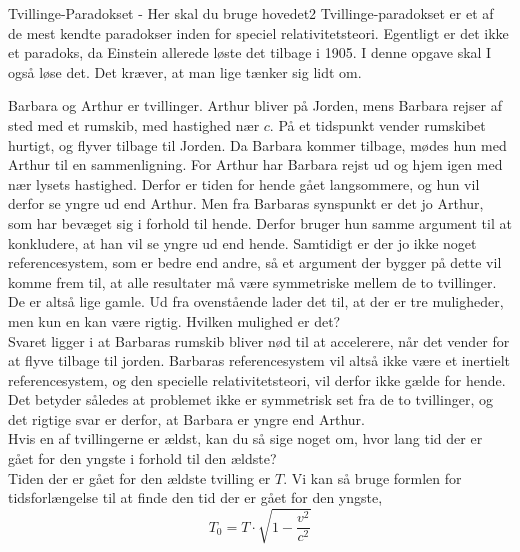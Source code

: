 \begin{opgave}{Tvillinge-Paradokset - Her skal du bruge hovedet}{2}
	Tvillinge-paradokset er et af de mest kendte paradokser inden for speciel relativitetsteori. Egentligt er det ikke
	et paradoks, da Einstein allerede løste det tilbage i 1905. I denne opgave skal I også løse det. Det kræver, at man
	lige tænker sig lidt om.
	
	Barbara og Arthur er tvillinger. Arthur bliver på Jorden, mens Barbara rejser af sted med et rumskib, med
	hastighed nær $c$. På et tidspunkt vender rumskibet hurtigt, og flyver tilbage til Jorden. Da Barbara kommer
	tilbage, mødes hun med Arthur til en sammenligning. For Arthur har Barbara rejst ud og hjem igen med nær
	lysets hastighed. Derfor er tiden for hende gået langsommere, og hun vil derfor se yngre ud end Arthur. Men
	fra Barbaras synspunkt er det jo Arthur, som har bevæget sig i forhold til hende. Derfor bruger hun samme
	argument til at konkludere, at han vil se yngre ud end hende. Samtidigt er der jo ikke noget referencesystem,
	som er bedre end andre, så et argument der bygger på dette vil komme frem til, at alle resultater må være
	symmetriske mellem de to tvillinger. De er altså lige gamle.
	\opg Ud fra ovenstående lader det til, at der er tre muligheder, men kun en kan være rigtig. Hvilken mulighed
	er det?\\
	
	Svaret ligger i at Barbaras rumskib bliver nød til at accelerere, når det vender for at flyve tilbage til jorden. Barbaras referencesystem vil altså ikke være et inertielt referencesystem, og den specielle relativitetsteori, vil derfor ikke gælde for hende. Det betyder således at problemet ikke er symmetrisk set fra de to tvillinger, og det rigtige svar er derfor, at Barbara er yngre end Arthur.\\
	\opg Hvis en af tvillingerne er ældst, kan du så sige noget om, hvor lang tid der er gået for den yngste i
	forhold til den ældste?\\
	
	Tiden der er gået for den ældste tvilling er $T$. Vi kan så bruge formlen for tidsforlængelse til at finde den tid der er gået for den yngste,
	$$T_0=T \cdot \sqrt{1-\frac{v^2}{c^2}}$$
\end{opgave}


